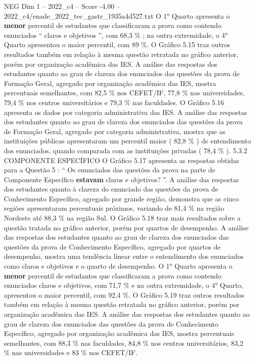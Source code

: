 \begin{textsample}{NEG Dim 1 – 2022\_c4 – Score -4.00 – 2022\_c4/enade\_2022\_tec\_gastr\_1935a4d527.txt}
O 1{\EmojiFont °} Quarto apresenta o \textbf{menor} percentil de estudantes que classificaram a prova como contendo enunciados “ claros e objetivos ”, com 68,3 \% ; na outra extremidade, o 4{\EmojiFont °} Quarto apresentou o maior percentil, com 89 \%.
O Gráfico 5.15 traz outros resultados também em relação à mesma questão retratada no gráfico anterior, porém por organização acadêmica das IES.
A análise das respostas dos estudantes quanto ao grau de clareza dos enunciados das questões da prova de Formação Geral, agregado por organização acadêmica das IES, mostra percentuais semelhantes, com 82,5 \% nos CEFET/IF, 77,8 \% nas universidades, 79,4 \% nos centros universitários e 79,3 \% nas faculdades.
O Gráfico 5.16 apresenta os dados por categoria administrativa das IES.
A análise das respostas dos estudantes quanto ao grau de clareza dos enunciados das questões da prova de Formação Geral, agregado por categoria administrativa, mostra que as instituições públicas apresentaram um percentil maior ( 82,8 \% ) de entendimento dos enunciados, quando comparada com as instituições privadas ( 78,4 \% ). 5.3.2 COMPONENTE ESPECÍFICO O Gráfico 5.17 apresenta as respostas obtidas para a Questão 5 : “ Os enunciados das questões da prova na parte de Componente Específico \textbf{estavam} claros e objetivos? ”.
A análise das respostas dos estudantes quanto à clareza do enunciado das questões da prova de Conhecimento Específico, agregado por grande região, demonstra que as cinco regiões apresentaram percentuais próximos, variando de 81,4 \% na região Nordeste até 88,3 \% na região Sul.
O Gráfico 5.18 traz mais resultados sobre a questão tratada no gráfico anterior, porém por quartos de desempenho.
A análise das respostas dos estudantes quanto ao grau de clareza dos enunciados das questões da prova de Conhecimento Específico, agregado por quartos de desempenho, mostra uma tendência linear entre o entendimento dos enunciados como claros e objetivos e o quarto de desempenho.
O 1{\EmojiFont °} Quarto apresenta o \textbf{menor} percentil de estudantes que classificaram a prova como contendo enunciados claros e objetivos, com 71,7 \% e na outra extremidade, o 4{\EmojiFont °} Quarto, apresentou o maior percentil, com 92,4 \%.
O Gráfico 5.19 traz outros resultados também em relação à mesma questão retratada no gráfico anterior, porém por organização acadêmica das IES.
A análise das respostas dos estudantes quanto ao grau de clareza dos enunciados das questões da prova de Conhecimento Específico, agregado por organização acadêmica das IES, mostra percentuais semelhantes, com 88,3 \% nas faculdades, 84,8 \% nos centros universitários, 83,2 \% nas universidades e 83 \% nos CEFET/IF.

\end{textsample}
